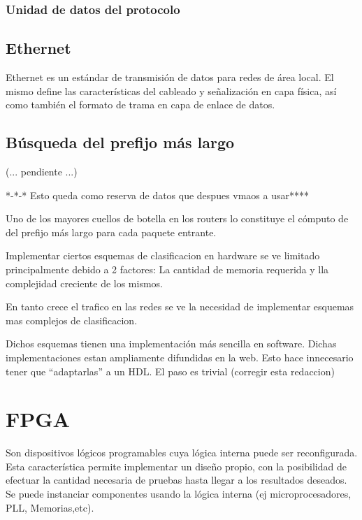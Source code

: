 \subsubsection{Unidad de datos del protocolo}



\subsection{Ethernet}

Ethernet es un estándar de transmisión de datos para redes de área local. El mismo define las características del cableado y señalización en capa física, así como también el formato de trama en capa de enlace de datos.



\subsection{Búsqueda del prefijo más largo}

(... pendiente ...)


*-*-* Esto queda como reserva de datos que despues vmaos a usar****

Uno de los mayores cuellos de botella en los routers lo constituye el cómputo de del prefijo más largo para cada paquete entrante.

Implementar ciertos esquemas de clasificacion en hardware se ve limitado principalmente debido a 2 factores: La cantidad de memoria requerida y lla complejidad creciente de los mismos.

En tanto crece el trafico en las redes se ve la necesidad de implementar esquemas mas complejos de clasificacion.

Dichos esquemas tienen una implementación más sencilla en software. Dichas implementaciones estan ampliamente difundidas en la web.
Esto hace innecesario tener que “adaptarlas” a un HDL. El paso es trivial (corregir esta redaccion)

\section{FPGA}
Son dispositivos lógicos programables cuya lógica interna puede ser reconfigurada. Esta característica permite implementar un diseño propio, con la posibilidad de efectuar la cantidad necesaria de pruebas hasta llegar a los resultados deseados. Se puede instanciar componentes usando la lógica interna (ej microprocesadores, PLL, Memorias,etc).

